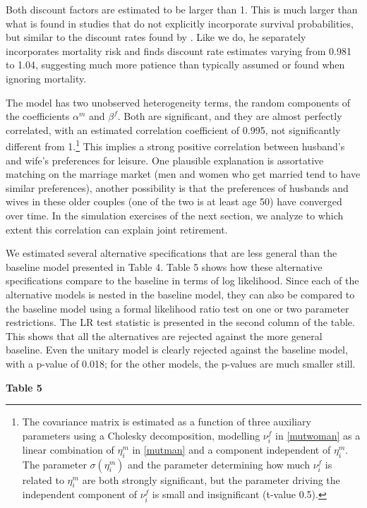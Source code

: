 \documentclass[11pt,letter]{article}
\begin{document}
Both discount factors are estimated to be larger than 1. This is much larger than what is found in studies that do not explicitly incorporate survival probabilities, but similar to the discount rates found by \citet{French2005}. Like we do, he separately incorporates mortality risk and finds discount rate estimates varying from 0.981 to 1.04, suggesting much more patience than typically assumed or found when ignoring mortality.

The model has two unobserved heterogeneity terms, the random components of the coefficients $\alpha^m$ and $\beta^f$. Both are significant, and they are almost perfectly correlated, with an estimated correlation coefficient of 0.995, not significantly different from 1.\footnote{The covariance matrix is estimated as a function of three auxiliary parameters using a Cholesky decomposition, modelling $\nu_i^f$ in \ref{mutwoman} as a linear combination of $\eta_i^m$ in \ref{mutman} and a component independent of $\eta_i^m$.  The parameter $\sigma(\eta_{i}^{m})$ and the parameter determining how much $\nu_{i}^{f}$ is related to $\eta_{i}^{m}$ are both strongly significant, but the parameter driving the independent component of $\nu_i^f$ is small and insignificant (t-value 0.5).}
This implies a strong positive correlation between husband's and wife's preferences for leisure. One plausible explanation is assortative matching on the marriage market (men and women who get married tend to have similar preferences), another possibility is that the preferences of husbands and wives in these older couples (one of the two is at least age 50) have converged over time. In the simulation exercises of the next section, we analyze to which extent this correlation can explain joint retirement.

We estimated several alternative specifications that are less general than the baseline model presented in Table 4. Table 5 shows how these alternative specifications compare to the baseline in terms of log likelihood. Since each of the alternative models is nested in the baseline model, they can also be compared to the baseline model using a formal likelihood ratio test on one or two parameter restrictions. The LR test statistic is presented in the second column of the table. This shows that all the alternatives are rejected against the more general baseline. Even the unitary model is clearly rejected against the baseline model, with a p-value of 0.018; for the other models, the p-values are much smaller still.

\begin{center}
\textbf{Table 5}
\end{center}
\end{document}
